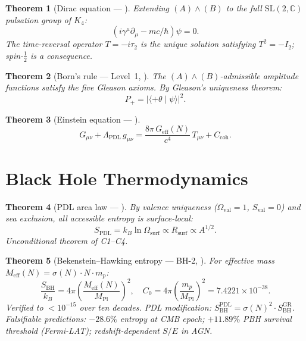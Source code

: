 \documentclass[12pt,a4paper]{article}
\theoremstyle{plain}
\newtheorem{theorem}{Theorem}[section]
\theoremstyle{definition}
\theoremstyle{remark}
\newcommand{\Kfour}{K_4}
\newcommand{\sigmaN}{\sigma(N)}
\newcommand{\Geff}{G_{\mathrm{eff}}}
\newcommand{\Rsurf}{R_{\mathrm{surf}}}
\newcommand{\MPl}{M_{\mathrm{Pl}}}
\newcommand{\Meff}{M_{\mathrm{eff}}}
\newcommand{\SBH}{S_{\mathrm{BH}}}
\begin{document}
\begin{theorem}[Dirac equation --- \citep{D33}]
\label{thm:dirac}
Extending $(A)\wedge(B)$ to the full $\mathrm{SL}(2,\mathbb{C})$ pulsation group of $\Kfour$:
\[
(i\gamma^\mu\partial_\mu - mc/\hbar)\psi = 0.
\]
The time-reversal operator $T=-i\tau_2$ is the unique solution satisfying $T^2=-I_2$; spin-$\tfrac{1}{2}$ is a consequence.
\end{theorem}

\begin{theorem}[Born's rule --- Level~1, \citep{D34}]
\label{thm:born}
The $(A)\wedge(B)$-admissible amplitude functions satisfy the five Gleason axioms. By Gleason's uniqueness theorem:
\[
P_+ = |\langle+\theta\mid\psi\rangle|^2.
\]
\end{theorem}

\begin{theorem}[Einstein equation --- \citep{D35}]
\label{thm:einstein}
\[
G_{\mu\nu}+\Lambda_{\mathrm{PDL}}\,g_{\mu\nu} = \frac{8\pi\,\Geff(N)}{c^4}\,T_{\mu\nu}+C_{\mathrm{coh}}.
\]
\end{theorem}

\section{Black Hole Thermodynamics}
\label{sec:thermodynamics}

\begin{theorem}[PDL area law --- \citep{D37}]
\label{thm:arealaw}
By valence uniqueness ($\Omega_{\mathrm{val}}=1$, $S_{\mathrm{val}}=0$) and sea exclusion, all accessible entropy is surface-local:
\[
S_{\mathrm{PDL}} = k_B\ln\Omega_{\mathrm{surf}}\propto\Rsurf\propto A^{1/2}.
\]
Unconditional theorem of C1--C4.
\end{theorem}

\begin{theorem}[Bekenstein--Hawking entropy --- BH-2, \citep{D38}]
\label{thm:BH}
For effective mass $\Meff(N)=\sigmaN\cdot N\cdot m_p$:
\[
\frac{\SBH}{k_B} = 4\pi\left(\frac{\Meff(N)}{\MPl}\right)^2,\quad C_0 = 4\pi\!\left(\frac{m_p}{\MPl}\right)^{\!2} = 7.4221\times10^{-38}.
\]
Verified to $<10^{-15}$ over ten decades. PDL modification: $\SBH^{\mathrm{PDL}}=\sigmaN^2\cdot\SBH^{\mathrm{GR}}$. Falsifiable predictions: $-28.6\%$ entropy at CMB epoch; $+11.89\%$ PBH survival threshold (Fermi-LAT); redshift-dependent $S/E$ in AGN.
\end{theorem}
\end{document}
